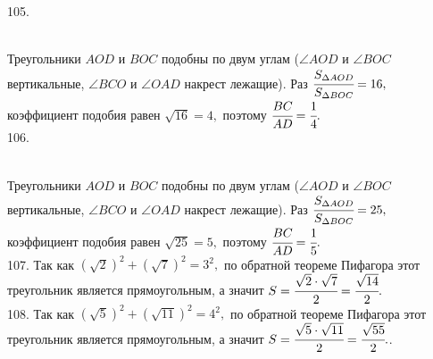 \documentclass[12pt]{article}
\begin{document}
105. \begin{figure}[ht!]
\end{figure}\\
Треугольники $AOD$ и $BOC$ подобны по двум углам ($\angle AOD$ и $\angle BOC$ вертикальные, $\angle BCO$ и $\angle OAD$ накрест лежащие). Раз
$\cfrac{S_{\Delta AOD}}{S_{\Delta BOC}}=16,$ коэффициент подобия равен $\sqrt{16}=4,$ поэтому $\cfrac{BC}{AD}=\cfrac{1}{4}.$\\
106. \begin{figure}[ht!]
\end{figure}\\
Треугольники $AOD$ и $BOC$ подобны по двум углам ($\angle AOD$ и $\angle BOC$ вертикальные, $\angle BCO$ и $\angle OAD$ накрест лежащие). Раз
$\cfrac{S_{\Delta AOD}}{S_{\Delta BOC}}=25,$ коэффициент подобия равен $\sqrt{25}=5,$ поэтому $\cfrac{BC}{AD}=\cfrac{1}{5}.$\\
107. Так как $(\sqrt{2})^2+(\sqrt{7})^2=3^2,$ по обратной теореме Пифагора этот треугольник является прямоугольным, а значит $S=\cfrac{\sqrt{2}\cdot\sqrt{7}}{2}=\cfrac{\sqrt{14}}{2}.$\\
108. Так как $(\sqrt{5})^2+(\sqrt{11})^2=4^2,$ по обратной теореме Пифагора этот треугольник является прямоугольным, а значит $S=\cfrac{\sqrt{5}\cdot\sqrt{11}}{2}=\cfrac{\sqrt{55}}{2}.$\newpage{}. \begin{figure}[ht!]
\end{figure}\\
\end{document}
